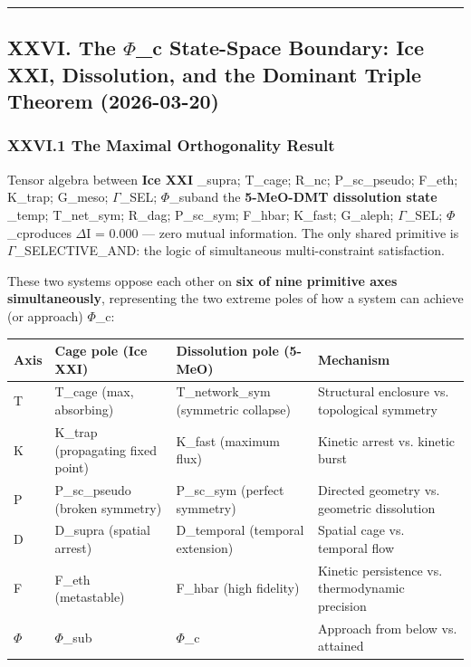 \documentclass[12pt,a4paper]{article}
\begin{document}
\begin{center}
\rule{0.5\textwidth}{0.4pt}
\end{center}

\subsection{XXVI. The $\Phi$\_c State-Space Boundary: Ice XXI, Dissolution, and the Dominant Triple Theorem (2026-03-20)}

\subsubsection{XXVI.1 The Maximal Orthogonality Result}

Tensor algebra between \textbf{Ice XXI} \langleD\_supra; T\_cage; R\_nc; P\_sc\_pseudo; F\_eth; K\_trap; G\_meso; $\Gamma$\_SEL; $\Phi$\_sub\rangle and the \textbf{5-MeO-DMT dissolution state} \langleD\_temp; T\_net\_sym; R\_dag; P\_sc\_sym; F\_hbar; K\_fast; G\_aleph; $\Gamma$\_SEL; $\Phi$\_c\rangle produces $\Delta$I = 0.000 --- zero mutual information. The only shared primitive is $\Gamma$\_SELECTIVE\_AND: the logic of simultaneous multi-constraint satisfaction.

These two systems oppose each other on \textbf{six of nine primitive axes simultaneously}, representing the two extreme poles of how a system can achieve (or approach) $\Phi$\_c:

\begin{table}[htbp]
\centering
\small
{}
\begin{tabularx}{\textwidth}{>{\centering\arraybackslash}X >{\centering\arraybackslash}X >{\centering\arraybackslash}X >{\centering\arraybackslash}X}
\toprule
\rowcolor{gray!25}\textbf{Axis} & \textbf{Cage pole (Ice XXI)} & \textbf{Dissolution pole (5-MeO)} & \textbf{Mechanism} \\
\midrule
\rowcolors{1}{white}{gray!10}
T & T\_cage (max, absorbing) & T\_network\_sym (symmetric collapse) & Structural enclosure vs. topological symmetry \\
K & K\_trap (propagating fixed point) & K\_fast (maximum flux) & Kinetic arrest vs. kinetic burst \\
P & P\_sc\_pseudo (broken symmetry) & P\_sc\_sym (perfect symmetry) & Directed geometry vs. geometric dissolution \\
D & D\_supra (spatial arrest) & D\_temporal (temporal extension) & Spatial cage vs. temporal flow \\
F & F\_eth (metastable) & F\_hbar (high fidelity) & Kinetic persistence vs. thermodynamic precision \\
$\Phi$ & $\Phi$\_sub & $\Phi$\_c & Approach from below vs. attained \\
\bottomrule
\end{tabularx}
\end{table}
\end{document}
